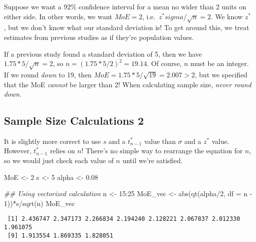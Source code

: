 \documentclass[
  letterpaper,
  DIV=11,
  numbers=noendperiod]{scrreprt}
\newenvironment{Shaded}{\begin{snugshade}}{\end{snugshade}}
\newcommand{\AttributeTok}[1]{\textcolor[rgb]{0.40,0.45,0.13}{#1}}
\newcommand{\DecValTok}[1]{\textcolor[rgb]{0.68,0.00,0.00}{#1}}
\newcommand{\DocumentationTok}[1]{\textcolor[rgb]{0.37,0.37,0.37}{\textit{#1}}}
\newcommand{\FloatTok}[1]{\textcolor[rgb]{0.68,0.00,0.00}{#1}}
\newcommand{\FunctionTok}[1]{\textcolor[rgb]{0.28,0.35,0.67}{#1}}
\newcommand{\NormalTok}[1]{\textcolor[rgb]{0.00,0.23,0.31}{#1}}
\newcommand{\OtherTok}[1]{\textcolor[rgb]{0.00,0.23,0.31}{#1}}
\newcommand{\SpecialCharTok}[1]{\textcolor[rgb]{0.37,0.37,0.37}{#1}}
\begin{document}
Suppose we want a 92\% confidence interval for a mean no wider than 2
units on either side. In other words, we want \(MoE = 2\),
i.e.~\(z^*sigma/\sqrt n = 2\). We know \(z^*\), but we don't know what
our standard deviation is! To get around this, we treat estimates from
previous studies as if they're population values.

If a previous study found a standard deviation of 5, then we have
\(1.75*5/\sqrt n = 2\), so \(n = (1.75*5/2)^2 = 19.14\). Of course,
\(n\) must be an integer. If we round \emph{down} to 19, then
\(MoE = 1.75*5/\sqrt{19} = 2.007 > 2\), but we specified that the MoE
\emph{cannot} be larger than 2! When calculating sample size,
\emph{never round down}.

\hypertarget{sample-size-calculations-2}{%
\subsection{Sample Size Calculations
2}\label{sample-size-calculations-2}}

It is slightly more correct to use \(s\) and a \(t^*_{n-1}\) value than
\(\sigma\) and a \(z^*\) value. However, \(t^*_{n-1}\) relies on \(n\)!
There's no simple way to rearrange the equation for \(n\), so we would
just check each value of \(n\) until we're satisfied.

\begin{Shaded}
\begin{Highlighting}[]
\NormalTok{MoE }\OtherTok{\textless{}{-}} \DecValTok{2}
\NormalTok{s }\OtherTok{\textless{}{-}} \DecValTok{5}
\NormalTok{alpha }\OtherTok{\textless{}{-}} \FloatTok{0.08}

\DocumentationTok{\#\# Using vectorized calculation}
\NormalTok{n }\OtherTok{\textless{}{-}} \DecValTok{15}\SpecialCharTok{:}\DecValTok{25}
\NormalTok{MoE\_vec }\OtherTok{\textless{}{-}} \FunctionTok{abs}\NormalTok{(}\FunctionTok{qt}\NormalTok{(alpha}\SpecialCharTok{/}\DecValTok{2}\NormalTok{, }\AttributeTok{df =}\NormalTok{ n }\SpecialCharTok{{-}} \DecValTok{1}\NormalTok{))}\SpecialCharTok{*}\NormalTok{s}\SpecialCharTok{/}\FunctionTok{sqrt}\NormalTok{(n) }
\NormalTok{MoE\_vec}
\end{Highlighting}
\end{Shaded}

\begin{verbatim}
 [1] 2.436747 2.347173 2.266834 2.194240 2.128221 2.067837 2.012330 1.961075
 [9] 1.913554 1.869335 1.828051
\end{verbatim}
\end{document}
